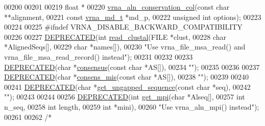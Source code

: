 \begin{DoxyCode}
00200 
00201 
00219 \textcolor{keywordtype}{float} *
00220 \mbox{\hyperlink{group__aln__utils_gaa12b481a7e7b965ef2eb1bcc4399e759}{vrna\_aln\_conservation\_col}}(\textcolor{keyword}{const} \textcolor{keywordtype}{char}      **alignment,
00221                           \textcolor{keyword}{const} \mbox{\hyperlink{group__model__details_structvrna__md__s}{vrna\_md\_t}} *md\_p,
00222                           \textcolor{keywordtype}{unsigned} \textcolor{keywordtype}{int}    options);
00223 
00224 
00225 \textcolor{preprocessor}{#ifndef VRNA\_DISABLE\_BACKWARD\_COMPATIBILITY}
00226 
00227 \mbox{\hyperlink{aln__util_8h_aab347a3c03fbe8e7319551b9fa0cce4a}{DEPRECATED}}(\textcolor{keywordtype}{int} \mbox{\hyperlink{group__aln__utils_ga1cc88b4df842ca73b4ac0cb5e71c696a}{read\_clustal}}(FILE  *clust,
00228                             \textcolor{keywordtype}{char}  *AlignedSeqs[],
00229                             \textcolor{keywordtype}{char}  *names[]),
00230           \textcolor{stringliteral}{"Use vrna\_file\_msa\_read() and vrna\_file\_msa\_read\_record() instead"});
00231 
00232 
00233 \mbox{\hyperlink{aln__util_8h_aab347a3c03fbe8e7319551b9fa0cce4a}{DEPRECATED}}(\textcolor{keywordtype}{char} *\mbox{\hyperlink{group__aln__utils_ga8e8b805faaf6dee2feb4cbc38ba48e71}{consensus}}(\textcolor{keyword}{const} \textcolor{keywordtype}{char} *AS[]),
00234           \textcolor{stringliteral}{""});
00235 
00236 
00237 \mbox{\hyperlink{aln__util_8h_aab347a3c03fbe8e7319551b9fa0cce4a}{DEPRECATED}}(\textcolor{keywordtype}{char} *\mbox{\hyperlink{group__aln__utils_gab8c6d748a1b44e516759233879dadcc7}{consens\_mis}}(\textcolor{keyword}{const} \textcolor{keywordtype}{char} *AS[]),
00238           \textcolor{stringliteral}{""});
00239 
00240 
00241 \mbox{\hyperlink{aln__util_8h_aab347a3c03fbe8e7319551b9fa0cce4a}{DEPRECATED}}(\textcolor{keywordtype}{char} *\mbox{\hyperlink{group__aln__utils_ga4a17a26c6cfc1ad5bf4c3d035292a275}{get\_ungapped\_sequence}}(\textcolor{keyword}{const} \textcolor{keywordtype}{char} *seq),
00242           \textcolor{stringliteral}{""});
00243 
00244 
00256 \mbox{\hyperlink{aln__util_8h_aab347a3c03fbe8e7319551b9fa0cce4a}{DEPRECATED}}(\textcolor{keywordtype}{int} \mbox{\hyperlink{group__aln__utils_gaa2d600be90844094ec145ea14a314d2f}{get\_mpi}}(\textcolor{keywordtype}{char} *Alseq[],
00257                        \textcolor{keywordtype}{int}  n\_seq,
00258                        \textcolor{keywordtype}{int}  length,
00259                        \textcolor{keywordtype}{int}  *mini),
00260           \textcolor{stringliteral}{"Use vrna\_aln\_mpi() instead"});
00261 
00262 \textcolor{comment}{/*}

\end{DoxyCode}
